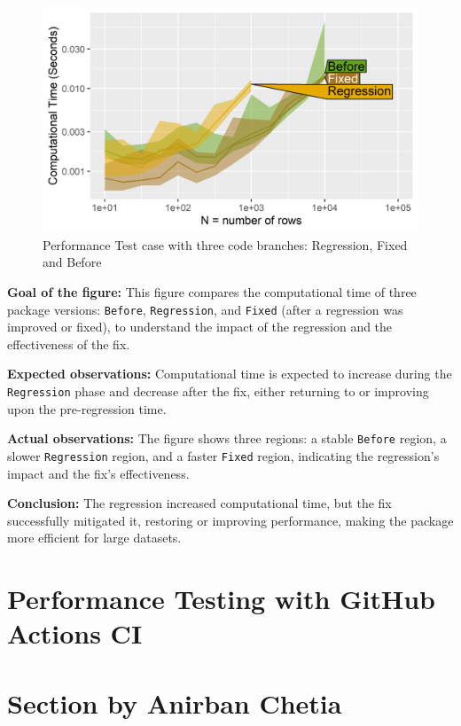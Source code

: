 \begin{figure}[H]
    \centering
    \includegraphics[width=0.7\linewidth]{figures/atime.list.4200.png}
    \caption{Performance Test case with three code branches: Regression, Fixed and Before}
    \label{fig:label4}
\end{figure}

\textbf{Goal of the figure:} This figure compares the computational time of three package versions: \texttt{Before}, \texttt{Regression}, and \texttt{Fixed} (after a regression was improved or fixed), to understand the impact of the regression and the effectiveness of the fix.

\textbf{Expected observations:} Computational time is expected to increase during the \texttt{Regression} phase and decrease after the fix, either returning to or improving upon the pre-regression time.

\textbf{Actual observations:} The figure shows three regions: a stable \texttt{Before} region, a slower \texttt{Regression} region, and a faster \texttt{Fixed} region, indicating the regression's impact and the fix's effectiveness.

\textbf{Conclusion:} The regression increased computational time, but the fix successfully mitigated it, restoring or improving performance, making the package more efficient for large datasets.

\section{Performance Testing with GitHub Actions CI}
\section{Section by Anirban Chetia}

